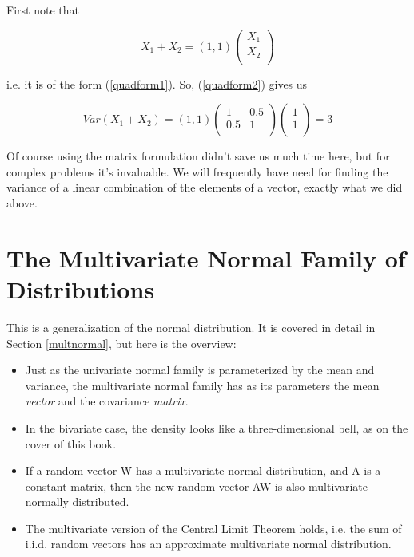 First note that

\begin{equation}
X_1 + X_2 = (1,1) 
\left (
\begin{array}{r}
X_1 \\
X_2 \\
\end{array}
\right )
\end{equation}

i.e. it is of the form (\ref{quadform1}).  So, (\ref{quadform2}) gives
us

\begin{equation}
\label{easyvar}
Var(X_1 + X_2) =
(1,1)
\left (
\begin{array}{rr}
1 & 0.5 \\
0.5 & 1 \\
\end{array}
\right )
\left (
\begin{array}{r}
1 \\
1 \\
\end{array}
\right )
= 3
\end{equation}

Of course using the matrix formulation didn't save us much time here,
but for complex problems it's invaluable.  We will frequently have need
for finding the variance of a linear combination of the elements of a
vector, exactly what we did above.

\section{The Multivariate Normal Family of Distributions}
\label{multnorm}

This is a generalization of the normal distribution.  It is covered in
detail in Section \ref{multnormal}, but here is the overview:

\begin{itemize}

\item Just as the univariate normal family is parameterized by the mean and
variance, the multivariate normal family has as its parameters the mean
{\it vector} and the covariance {\it matrix}.  

\item In the bivariate case, the density looks like a three-dimensional
bell, as on the cover of this book.

\item If a random vector W has a multivariate normal distribution, and A
is a constant matrix, then the new random vector AW is also multivariate
normally distributed.

\item The multivariate version of the Central Limit Theorem holds, i.e.
the sum of i.i.d. random vectors has an approximate multivariate normal
distribution.

\end{itemize}

